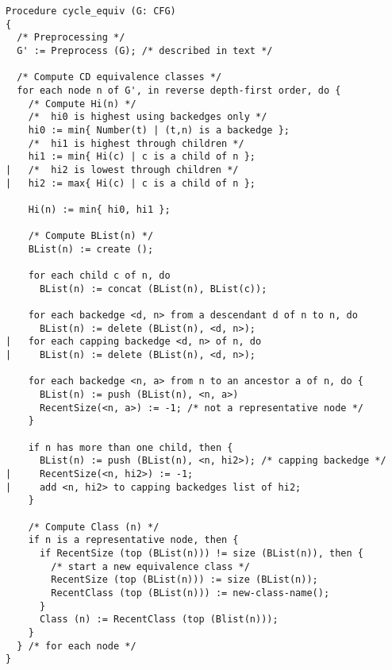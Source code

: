 \begin{verbatim}
Procedure cycle_equiv (G: CFG)
{
  /* Preprocessing */
  G' := Preprocess (G); /* described in text */

  /* Compute CD equivalence classes */
  for each node n of G', in reverse depth-first order, do {
    /* Compute Hi(n) */
    /*  hi0 is highest using backedges only */
    hi0 := min{ Number(t) | (t,n) is a backedge };
    /*  hi1 is highest through children */
    hi1 := min{ Hi(c) | c is a child of n };
|   /*  hi2 is lowest through children */
|   hi2 := max{ Hi(c) | c is a child of n };

    Hi(n) := min{ hi0, hi1 };

    /* Compute BList(n) */
    BList(n) := create ();

    for each child c of n, do
      BList(n) := concat (BList(n), BList(c));

    for each backedge <d, n> from a descendant d of n to n, do
      BList(n) := delete (BList(n), <d, n>);
|   for each capping backedge <d, n> of n, do
|     BList(n) := delete (BList(n), <d, n>);

    for each backedge <n, a> from n to an ancestor a of n, do {
      BList(n) := push (BList(n), <n, a>)
      RecentSize(<n, a>) := -1; /* not a representative node */
    }

    if n has more than one child, then {
      BList(n) := push (BList(n), <n, hi2>); /* capping backedge */
|     RecentSize(<n, hi2>) := -1;
|     add <n, hi2> to capping backedges list of hi2;
    }

    /* Compute Class (n) */
    if n is a representative node, then {
      if RecentSize (top (BList(n))) != size (BList(n)), then {
        /* start a new equivalence class */
        RecentSize (top (BList(n))) := size (BList(n));
        RecentClass (top (BList(n))) := new-class-name();
      }
      Class (n) := RecentClass (top (Blist(n)));
    }
  } /* for each node */
}
\end{verbatim}
